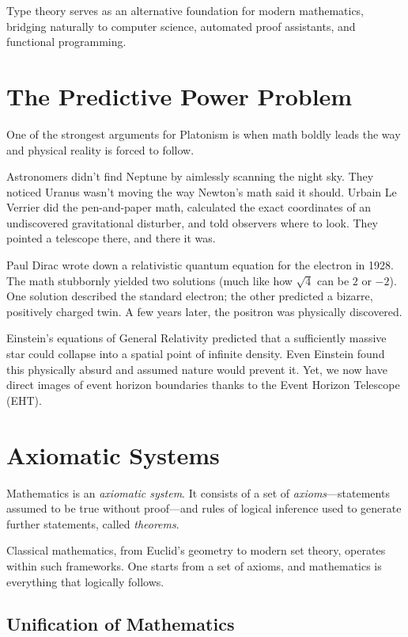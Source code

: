 Type theory serves as an alternative foundation for modern mathematics, bridging naturally to computer science, automated proof assistants, and functional programming.


\section{The Predictive Power Problem}

One of the strongest arguments for Platonism is when math boldly leads the way and physical reality is forced to follow.

Astronomers didn't find Neptune by aimlessly scanning the night sky.
They noticed Uranus wasn't moving the way Newton’s math said it should.
Urbain Le Verrier did the pen-and-paper math, calculated the exact coordinates of an undiscovered gravitational disturber, and told observers where to look.
They pointed a telescope there, and there it was.

Paul Dirac wrote down a relativistic quantum equation for the electron in 1928.
The math stubbornly yielded two solutions (much like how $\sqrt{4}$ can be $2$ or $-2$).
One solution described the standard electron; the other predicted a bizarre, positively charged twin.
A few years later, the positron was physically discovered.

Einstein’s equations of General Relativity predicted that a sufficiently massive star could collapse into a spatial point of infinite density.
Even Einstein found this physically absurd and assumed nature would prevent it. Yet, we now have direct images of event horizon boundaries thanks to the Event Horizon Telescope (EHT).


\section{Axiomatic Systems}

Mathematics is an \emph{axiomatic system}.
It consists of a set of \emph{axioms}---statements assumed to be true without proof---and rules of logical inference used to generate further statements, called \emph{theorems}.

Classical mathematics, from Euclid's geometry to modern set theory, operates within such frameworks.
One starts from a set of axioms, and mathematics is everything that logically follows.

\subsection*{Unification of Mathematics}

